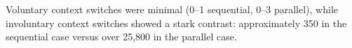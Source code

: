 




Voluntary context switches were minimal (0--1 sequential, 0--3 parallel), while involuntary context switches showed a stark contrast: approximately 350 in the sequential case versus over 25,800 in the parallel case.



